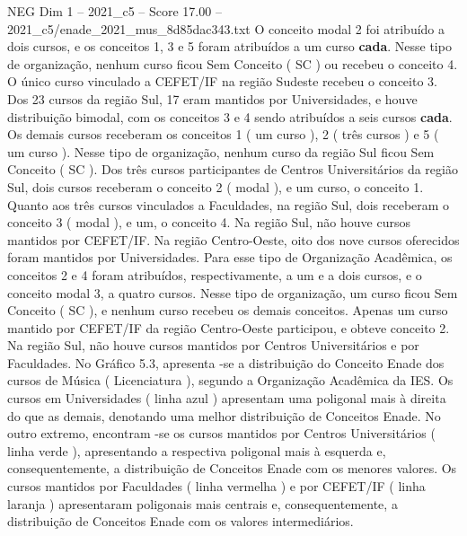 \begin{textsample}{NEG Dim 1 – 2021\_c5 – Score 17.00 – 2021\_c5/enade\_2021\_mus\_8d85dac343.txt}
O conceito modal 2 foi atribuído a dois cursos, e os conceitos 1, 3 e 5 foram atribuídos a um curso \textbf{cada}.
Nesse tipo de organização, nenhum curso ficou Sem Conceito ( SC ) ou recebeu o conceito 4.
O único curso vinculado a CEFET/IF na região Sudeste recebeu o conceito 3.
Dos 23 cursos da região Sul, 17 eram mantidos por Universidades, e houve distribuição bimodal, com os conceitos 3 e 4 sendo atribuídos a seis cursos \textbf{cada}.
Os demais cursos receberam os conceitos 1 ( um curso ), 2 ( três cursos ) e 5 ( um curso ).
Nesse tipo de organização, nenhum curso da região Sul ficou Sem Conceito ( SC ).
Dos três cursos participantes de Centros Universitários da região Sul, dois cursos receberam o conceito 2 ( modal ), e um curso, o conceito 1.
Quanto aos três cursos vinculados a Faculdades, na região Sul, dois receberam o conceito 3 ( modal ), e um, o conceito 4.
Na região Sul, não houve cursos mantidos por CEFET/IF.
Na região Centro-Oeste, oito dos nove cursos oferecidos foram mantidos por Universidades.
Para esse tipo de Organização Acadêmica, os conceitos 2 e 4 foram atribuídos, respectivamente, a um e a dois cursos, e o conceito modal 3, a quatro cursos.
Nesse tipo de organização, um curso ficou Sem Conceito ( SC ), e nenhum curso recebeu os demais conceitos.
Apenas um curso mantido por CEFET/IF da região Centro-Oeste participou, e obteve conceito 2.
Na região Sul, não houve cursos mantidos por Centros Universitários e por Faculdades.
No Gráfico 5.3, apresenta -se a distribuição do Conceito Enade dos cursos de Música ( Licenciatura ), segundo a Organização Acadêmica da IES.
Os cursos em Universidades ( linha azul ) apresentam uma poligonal mais à direita do que as demais, denotando uma melhor distribuição de Conceitos Enade.
No outro extremo, encontram -se os cursos mantidos por Centros Universitários ( linha verde ), apresentando a respectiva poligonal mais à esquerda e, consequentemente, a distribuição de Conceitos Enade com os menores valores.
Os cursos mantidos por Faculdades ( linha vermelha ) e por CEFET/IF ( linha laranja ) apresentaram poligonais mais centrais e, consequentemente, a distribuição de Conceitos Enade com os valores intermediários.

\end{textsample}
